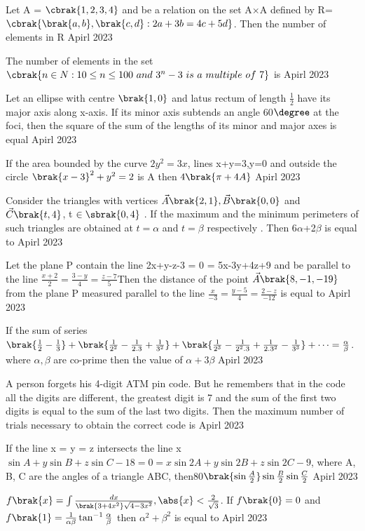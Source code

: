 \iffalse
  \title{Assignment}
  \author{EE24BTECH11038}
  \section{integer}
\fi 
\item Let A = $\cbrak{ 1 , 2 , 3, 4}$ and  be a relation on the set A$\times$A defined by R=$\cbrak{\brak{a,b},\brak{c,d}:2a + 3b = 4c + 5d}$. Then the number of elements in R \hfill{Apirl 2023}
\bigskip
\item The number of elements in the set $\cbrak{n\in N :10\leq n\leq 100 \,\,and\,\, 3^n-3 \,\,is\,\, a \,\,multiple \,\,of\,\, 7}$ is \hfill{Apirl 2023}
\bigskip
\item Let an ellipse with centre $\brak{1,0}$ and latus rectum of length $\frac{1}{2}$ have its major axis along x-axis. If its minor axis
subtends an angle 60$\degree$ at the foci, then the square of the sum of the lengths of its minor and major axes is equal \hfill{Apirl 2023}
\bigskip
\item If the area bounded by the curve $2y^2=3x$, lines x+y=3,y=0  and outside the circle $\brak{x-3}^2+y^{2}=2$ is A then $4\brak{\pi+4A}$ \hfill{Apirl 2023}
\bigskip
\item Consider the triangles with vertices $\vec{A}\brak{2,1}, \vec{B}\brak{0,0}$ and $\vec{C}\brak{t, 4}$, t $\in \sbrak{0,4}$ . If the maximum and the minimum perimeters of such triangles are obtained at $t=\alpha$ and $t=\beta$ respectively . Then 6$\alpha$+2$\beta$ is equal to \hfill{Apirl 2023}
\bigskip
\item Let the plane P contain the line 2x+y-z-3 = 0 = 5x-3y+4z+9 and be parallel to the line $\frac{x+2}{2}=\frac{3-y}{4}=\frac{z-7}{5}$Then the distance of the point $\vec{A}\brak{8,-1,-19}$ from the plane P measured parallel to the line $\frac{x}{-3}=\frac{y-5}{4}=\frac{2-z}{-12}$ is equal to  \hfill{Apirl 2023}
\bigskip 
\item If the sum of series $\brak{\frac{1}{2}-\frac{1}{3}}+\brak{\frac{1}{2^2}-\frac{1}{2.3}+\frac{1}{3^2}}+\brak{\frac{1}{2^3}-\frac{1}{2^2.3}+\frac{1}{2.3^2}-\frac{1}{3^3}}+\cdots=\frac{\alpha}{\beta}$. where $\alpha,\beta$ are co-prime then the value of $\alpha+3\beta$ \hfill{Apirl 2023}
\bigskip
\item A person forgets his 4-digit ATM pin code. But he remembers that in the code all the digits are different, the greatest digit is 7 and the sum of the first two digits is equal to the sum of the last two digits. Then the maximum number of trials necessary to obtain the correct code is \hfill{Apirl 2023}
\bigskip
\item  If the line x = y = z intersects the line x$\sin{A} + y\sin{B} + z\sin{C}-18 = 0 = x\sin{2A}+ y\sin{2B}+z\sin{2C}-9$,
where A, B, C are the angles of a triangle ABC, then80$\brak{\sin{\frac{A}{2}}}\sin{\frac{B}{2}}\sin{\frac{C}{2}}$ \hfill{Apirl 2023}
\bigskip
\item $f\brak{x}=\int\frac{dx}{\brak{3+4x^2}\sqrt{4-3x^2}},\abs{x}<\frac{2}{\sqrt{3}}$. If $f\brak{0}=0$ and $f\brak{1}=\frac{1}{\alpha \beta}\tan^{-1}\frac{\alpha}{\beta}$ then $\alpha^{2}+\beta^{2}$ is equal to \hfill{Apirl 2023}

